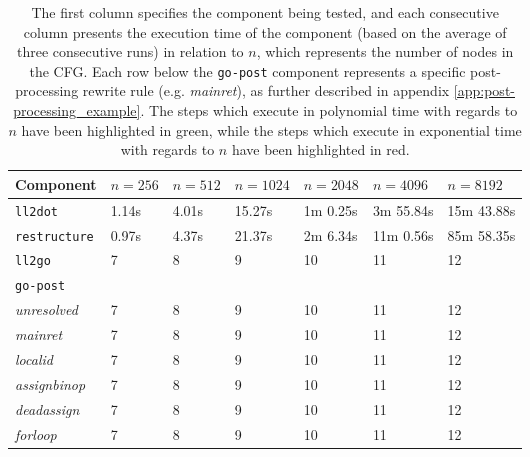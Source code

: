 \begin{table}[htbp]
	\begin{center}
		\begin{tabular}{|l|l|l|l|l|l|l|}
			\hline
			Component & $ n = 256 $ & $ n = 512 $ & $ n = 1024 $ & $ n = 2048 $ & $ n = 4096 $ & $ n = 8192 $ \\
			\hline
			\rowcolor{light_green_3}
			\texttt{ll2dot} & 1.14s & 4.01s & 15.27s & 1m 0.25s & 3m 55.84s & 15m 43.88s \\
			\rowcolor{light_green_3}
			\texttt{restructure} & 0.97s & 4.37s & 21.37s & 2m 6.34s & 11m 0.56s & 85m 58.35s \\
			\rowcolor{light_green_3}
			\texttt{ll2go} & 7 & 8 & 9 & 10 & 11 & 12 \\
			\hline
			\multicolumn{7}{|l|}{\texttt{go-post}} \\
			\hline
			\rowcolor{light_green_3}
			\textit{unresolved} & 7 & 8 & 9 & 10 & 11 & 12 \\
			\rowcolor{light_green_3}
			\textit{mainret} & 7 & 8 & 9 & 10 & 11 & 12 \\
			\rowcolor{light_red_3}
			\textit{localid} & 7 & 8 & 9 & 10 & 11 & 12 \\
			\rowcolor{light_green_3}
			\textit{assignbinop} & 7 & 8 & 9 & 10 & 11 & 12 \\
			\rowcolor{light_green_3}
			\textit{deadassign} & 7 & 8 & 9 & 10 & 11 & 12 \\
			\rowcolor{light_green_3}
			\textit{forloop} & 7 & 8 & 9 & 10 & 11 & 12 \\
			\hline
		\end{tabular}
	\end{center}
	\caption{The first column specifies the component being tested, and each consecutive column presents the execution time of the component (based on the average of three consecutive runs) in relation to $ n $, which represents the number of nodes in the CFG. Each row below the \texttt{go-post} component represents a specific post-processing rewrite rule (e.g. \textit{mainret}), as further described in appendix \ref{app:post-processing_example}. The steps which execute in polynomial time with regards to $ n $ have been highlighted in green, while the steps which execute in exponential time with regards to $ n $ have been highlighted in red.}
\end{table}

